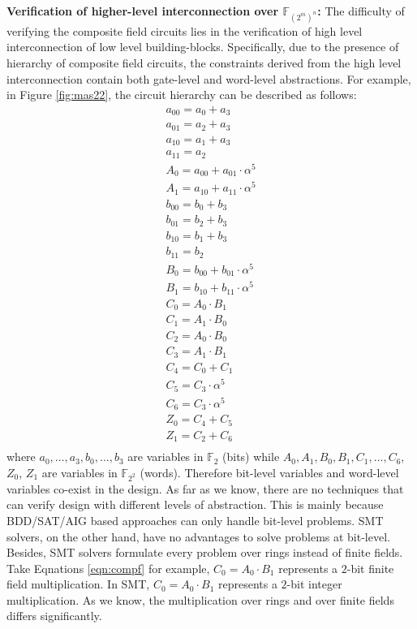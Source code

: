 {\bf Verification of higher-level interconnection over $\mathbb{F}_{(2^m)^n}$:}
The difficulty of verifying the composite field circuits 
lies in the verification of high level interconnection of low level building-blocks.
Specifically, due to the presence of hierarchy of composite field circuits, 
the constraints derived from the high level interconnection contain
both gate-level and word-level abstractions. For example, in Figure \ref{fig:mas22},
the circuit hierarchy can be described as follows:
\begin{eqnarray}\label{eqn:compf}
	a_{00}=a_0+a_3 \nonumber  \\
	a_{01}=a_2+a_3 \nonumber  \\
	a_{10}=a_1+a_3  \nonumber  \\
	a_{11}=a_2 \nonumber  \\
	A_0=a_{00}+a_{01} \cdot \alpha ^5 	\nonumber  \\
	A_1=a_{10}+a_{11} \cdot \alpha ^5   \nonumber  \\
	b_{00}=b_0+b_3		\nonumber  \\
	b_{01}=b_2+b_3		\nonumber  \\
	b_{10}=b_1+b_3		\nonumber  \\
	b_{11}=b_2			\nonumber  \\
	B_0=b_{00}+b_{01} \cdot \alpha ^5		\nonumber  \\	 
	B_1=b_{10}+b_{11} \cdot \alpha ^5		\nonumber  \\
	C_0 = A_0\cdot B_1		\nonumber  \\
	C_1 = A_1\cdot B_0		\nonumber  \\
	C_2 = A_0\cdot B_0		\nonumber  \\
	C_3 = A_1\cdot B_1		\nonumber  \\
	C_4 = C_0 + C_1			\nonumber  \\
	C_5 = C_3 \cdot \alpha ^5	\nonumber  \\
	C_6 = C_3 \cdot \alpha ^5	\nonumber  \\
	Z_0 = C_{4}+C_{5}			\nonumber  \\
	Z_{1}=C_{2}+C_{6}			\nonumber  \\ 
\end{eqnarray}
where $a_0, \dots, a_3, b_0,\dots,b_3$ are variables in $\mathbb{F}_{2}$ (bits) while 
$A_0,A_1,B_0,B_1, C_{1},\dots, C_{6}$, $Z_{0}$, $Z_{1}$ are variables in $\mathbb{F}_{2^2}$ (words).
Therefore bit-level variables and word-level variables co-exist in the design.
As far as we know, there are no techniques that can verify design with different levels of abstraction.
This is mainly because BDD/SAT/AIG based approaches can only handle bit-level problems. 
SMT solvers, on the other hand, have no advantages to solve problems at bit-level. 
Besides, SMT solvers formulate every problem over rings instead of finite fields. 
Take Eqnations \ref{eqn:compf} for example, $C_0 = A_0\cdot B_1$ represents a $2$-bit finite field multiplication.
In SMT,  $C_0 = A_0\cdot B_1$ represents a $2$-bit integer multiplication. As we know, the multiplication over rings and over finite fields differs significantly.
 
